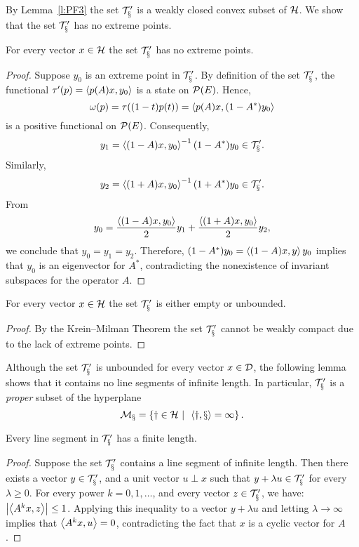 \medskip

By Lemma~\ref{l:PF3} the set $\cal{T}'_x$ is a weakly closed convex subset of
${\cal H}$. We show that the set $\cal{T}'_x$ has no extreme points.

\smallskip

\begin{lem} \label{l:EXTR}
For every vector $x\in{\cal H}$ the set $\cal{T}'_x$ has no extreme points.
\end{lem}

\begin{proof}
Suppose $y_0$ is an extreme point in $\cal{T}'_x$. By definition of the set
$\cal{T}'_x$, the functional $\tau'(p)=\left<p(A)x,y_0\right>$ is a state on
${\cal{P}}(E)$. Hence,
\[ \omega(p)=\tau((1-t)p(t))=\left<p(A)x, (1-A^*)y_0\right> \]
is a positive functional on ${\cal{P}}(E)$. Consequently,
\[ y_1 = \left<(1-A)x, y_0\right>^{-1}(1-A^*)y_0 \in \cal{T}'_x. \]
Similarly,
\[ y_2 = \left<(1+A)x, y_0\right>^{-1}(1+A^*)y_0 \in \cal{T}'_x. \]
From
\[ y_0 = \frac{\left<(1-A)x, y_0\right>}{2} y_1 +
         \frac{\left<(1+A)x, y_0\right>}{2} y_2, \]
we conclude that $y_0=y_1=y_2$. Therefore, $(1-A^*)y_0=\left<(1-A)x,y\right>y_0$
implies that $y_0$ is an eigenvector for $A^*$, contradicting the
nonexistence of invariant subspaces for the operator $A$.
\end{proof}

\begin{cor} \label{c:UNBOUND}
For every vector $x\in{\cal H}$ the set $\cal{T}'_x$ is either empty or unbounded.
\end{cor}

\begin{proof}
By the Krein--Milman Theorem the set $\cal{T}'_x$ cannot be weakly compact
due to the lack of extreme points.
\end{proof}

\medskip

Although the set $\cal{T}'_x$ is unbounded for every vector $x\in{\cal{D}}$, the
following lemma shows that it contains no line segments of infinite length.
In particular, $\cal{T}'_x$ is a \emph{proper} subset of the hyperplane
\[ \cal{M}_x=\left\{y\in{\cal H}\,\,|\,\,\,\left<y,x\right>=1\right\}. \]

\medskip

\begin{lem} \label{l:FL}
Every line segment in $\cal{T}'_x$ has a finite length.
\end{lem}

\begin{proof}
Suppose the set $\cal{T}'_x$ contains a line segment of infinite length. Then
there exists a vector $y\in\cal{T}'_x$, and a unit vector $u\perp{x}$ such
that $y+\lambda u\in\cal{T}'_x$ for every $\lambda\geq0$. For every power
$k=0,1,\ldots$, and every vector $z\in\cal{T}'_x$, we have: $\left\vert\left<A^k
x,z\right>\right\vert\leq1$. Applying this inequality to a vector $y+\lambda u$ and letting
$\lambda\to\infty$ implies that $\left<A^k x,u\right>=0$, contradicting the fact
that $x$ is a cyclic vector for $A$.
\end{proof}

